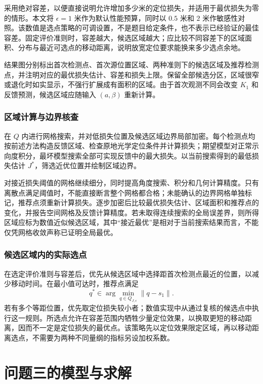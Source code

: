 \documentclass[UTF8,a4paper,zihao=-4,fontset=none]{ctexart}
\begin{document}
采用绝对容差，以便直接说明允许增加多少米的定位损失，并适用于最优损失为零的情形。本文将 \(\epsilon=1\) 米作为默认性能预算，同时以 \(0.5\) 米和 \(2\) 米作敏感性对照。该数值是选点策略的可调设置，不是题目给定条件，也不表示已经验证的最佳容差。固定评价准则时，容差越大，候选区域越大；应比较不同容差下的区域面积、分布与最近可选点的移动距离，说明放宽定位要求能换来多少选点余地。

结果图分别标出首次检测点、首次源位置区域、两种准则下的候选区域及推荐检测点，并注明对应的最优损失估计、容差和损失上限。保留全部候选分区，区域很窄或退化时如实显示，不强行扩展成有面积的区域。由于首次观测不同会改变 \(K_1\) 和反馈预测，候选区域应随输入 \((a,\beta)\) 重新计算。

\subsubsection{区域计算与边界核查}

在 \(Q\) 内进行网格搜索，并对低损失位置及候选区域边界局部加密。每个检测点均按前述方法构造反馈区域、检查原地光学定位条件并计算损失；期望模型对正常示向度积分，最坏模型搜索全部可实现反馈中的最大损失。以当前搜索得到的最低损失估计 \(J^*\)，筛选近优位置并绘制区域边界。

对接近损失阈值的网格继续细分，同时提高角度搜索、积分和几何计算精度。只有离散点满足阈值时，不能直接断言整个网格都合格；未能确认的边界网格单独标记，推荐点须重新计算损失。逐步加密后比较最优损失估计、区域面积和推荐点的变化，并报告空间网格及反馈计算精度。若未取得连续搜索的全局误差界，则所得区域应标为数值近似候选区域，其中“接近最优”是相对于当前搜索结果而言，不能仅凭网格收敛声称已证明全局最优。

\subsubsection{候选区域内的实际选点}

在选定评价准则与容差后，优先从候选区域中选择距首次检测点最近的位置，以减少移动时间。在最小值可达时，推荐点满足
\begin{equation}
 q^*\in\arg\min_{q\in Q_{J,\epsilon}}\|q-s_1\|.
 \label{eq:q2-candidate-selection}
\end{equation}
若有多个等距位置，优先取定位损失较小者；数值实现中从通过复核的候选点中执行这一规则。所选点允许在容差范围内牺牲少量定位效果，以换取更短的移动距离，因而不一定是定位损失的最优点。该策略先以定位效果限定区域，再以移动距离选点，不需要为两种不同量纲的指标另设加权系数。

\section{问题三的模型与求解}
\end{document}
